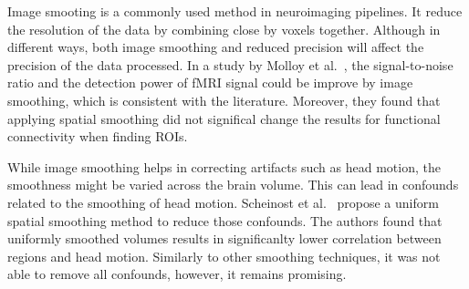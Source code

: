 Image smooting is a commonly used method in neuroimaging pipelines.
It reduce the resolution of the data by combining close by voxels together.
Although in different ways, both image smoothing and reduced precision will affect
the precision of the data processed.
In a study by Molloy et al.~\cite{Molloy2014-oc}, the signal-to-noise ratio and the detection power
of fMRI signal could be improve by image smoothing, which is consistent with the literature.
Moreover, they found that applying spatial smoothing did not significal change the
results for functional connectivity when finding ROIs.

While image smoothing helps in correcting artifacts such as head motion, the smoothness
might be varied across the brain volume.
This can lead in confounds related to the smoothing of head motion.
Scheinost et al.~\cite{Scheinost2014-ds} propose a uniform spatial smoothing method
to reduce those confounds.
The authors found that uniformly smoothed volumes results in significanlty lower
correlation between regions and head motion.
Similarly to other smoothing techniques, it was not able to remove all confounds, however,
it remains promising.
